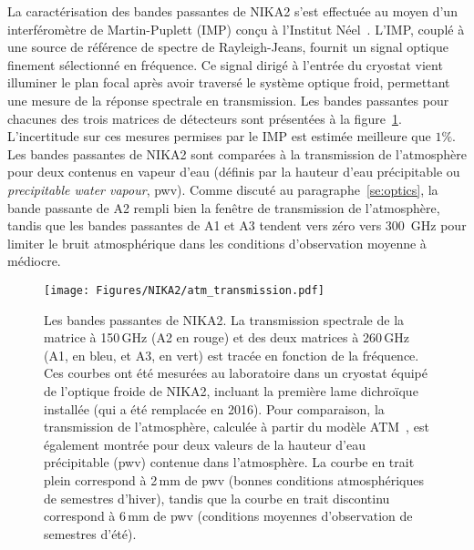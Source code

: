 La caractérisation des bandes passantes de NIKA2 s'est effectuée au
moyen d'un interféromètre de Martin-Puplett (IMP) conçu à l'Institut
Néel~\citep{Durand2007_these}. L'IMP, couplé à une source de référence de
spectre de Rayleigh-Jeans, fournit un signal optique finement
sélectionné en fréquence. Ce signal dirigé à l'entrée du cryostat
vient illuminer le plan focal après avoir traversé le système optique
froid, permettant une mesure de la réponse spectrale en
transmission. Les bandes passantes pour chacunes des trois matrices de
détecteurs sont présentées à la
figure~\ref{fig:bandpass}. L'incertitude sur ces mesures permises
par le IMP est estimée meilleure que $1\%$. Les bandes
passantes de NIKA2 sont comparées à la transmission de l'atmosphère
pour deux contenus en vapeur d'eau (définis par la hauteur d'eau
précipitable ou \emph{precipitable water vapour}, pwv). Comme discuté
au paragraphe~\ref{se:optics}, la bande passante de A2 rempli bien la
fenêtre de transmission de l'atmosphère, tandis que les bandes
passantes de A1 et A3 tendent vers zéro vers 300~GHz pour limiter le
bruit atmosphérique dans les conditions d'observation moyenne à
médiocre.

\begin{figure}[ht!] 
\begin{center}
\texttt{[image: Figures/NIKA2/atm\_transmission.pdf]}
\caption[Les bandes passantes]{Les bandes passantes de NIKA2. La
  transmission spectrale de la matrice à 150\,GHz (A2 en rouge) et des
  deux matrices à 260\,GHz (A1, en bleu, et A3, en vert) est tracée en
  fonction de la fréquence. Ces courbes ont été mesurées au
  laboratoire dans un cryostat équipé de l'optique froide de NIKA2,
  incluant la première lame dichroïque installée (qui a été remplacée
  en 2016). Pour comparaison, la transmission de l'atmosphère,
  calculée à partir du modèle ATM\citep{Pardo2002}~, est également
  montrée pour deux valeurs de la hauteur d'eau précipitable (pwv) contenue
  dans l'atmosphère. La courbe en trait plein correspond à 2\,mm de
  pwv (bonnes conditions atmosphériques de semestres d'hiver), tandis que la courbe
  en trait discontinu correspond à 6\,mm de pwv (conditions moyennes
  d'observation de semestres d'été).} 
 \label{fig:bandpass}
\end{center}
\end{figure}

%
%
%
%
%
%
%
